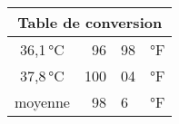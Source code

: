 \begin{tabular}{|c|r@{,}lc|}
    \hline
    \multicolumn{4}{|c|}{Table de conversion}\\
    \hline\hline
    36,1 °C & 96 & 98 & °F\\
    37,8 °C & 100 & 04 & °F\\
    \hline
    \multicolumn{1}{c|}{moyenne}
    & 98 & 6 & °F\\
    \cline{2-4}
\end{tabular}
